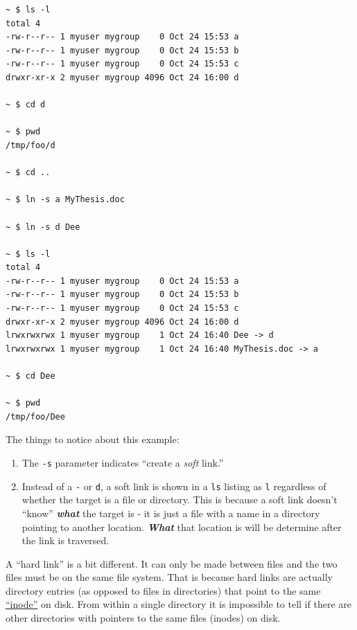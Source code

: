 \documentclass[10pt,]{book}
\numberwithin{figure}{chapter}
\begin{document}
\begin{verbatim}
~ $ ls -l
total 4
-rw-r--r-- 1 myuser mygroup    0 Oct 24 15:53 a
-rw-r--r-- 1 myuser mygroup    0 Oct 24 15:53 b
-rw-r--r-- 1 myuser mygroup    0 Oct 24 15:53 c
drwxr-xr-x 2 myuser mygroup 4096 Oct 24 16:00 d

~ $ cd d

~ $ pwd
/tmp/foo/d

~ $ cd ..

~ $ ln -s a MyThesis.doc

~ $ ln -s d Dee

~ $ ls -l
total 4
-rw-r--r-- 1 myuser mygroup    0 Oct 24 15:53 a
-rw-r--r-- 1 myuser mygroup    0 Oct 24 15:53 b
-rw-r--r-- 1 myuser mygroup    0 Oct 24 15:53 c
drwxr-xr-x 2 myuser mygroup 4096 Oct 24 16:00 d
lrwxrwxrwx 1 myuser mygroup    1 Oct 24 16:40 Dee -> d
lrwxrwxrwx 1 myuser mygroup    1 Oct 24 16:40 MyThesis.doc -> a

~ $ cd Dee

~ $ pwd
/tmp/foo/Dee
\end{verbatim}

The things to notice about this example:

\begin{enumerate}
\def\labelenumi{\arabic{enumi}.}
\item
  The \texttt{-s} parameter indicates ``create a \emph{soft} link.''
\item
  Instead of a \texttt{-} or \texttt{d}, a soft link is shown in a
  \texttt{ls} listing as \texttt{l} regardless of whether the target is
  a file or directory. This is because a soft link doesn't ``know''
  \textbf{\emph{what}} the target is - it is just a file with a name in
  a directory pointing to another location. \textbf{\emph{What}} that
  location is will be determine after the link is traversed.
\end{enumerate}

A ``hard link'' is a bit different. It can only be made between files
and the two files must be on the same file system. That is because hard
links are actually directory entries (as opposed to files in
directories) that point to the same
\href{https://en.wikipedia.org/wiki/Inode}{``inode''} on disk. From
within a single directory it is impossible to tell if there are other
directories with pointers to the same files (inodes) on disk.
\end{document}
